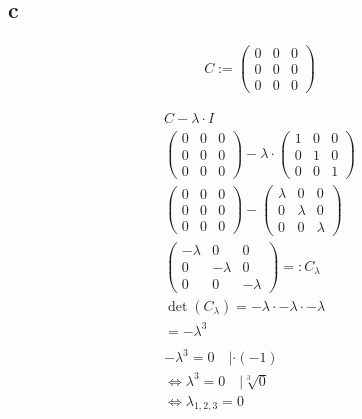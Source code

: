 \subsection{c}

\begin{align*}
    C := \begin{pmatrix}
             0 & 0 & 0 \\
             0 & 0 & 0 \\
             0 & 0 & 0
         \end{pmatrix}
\end{align*}

\begin{align*}
    C - \lambda \cdot I                                      \\
    \begin{pmatrix}
        0 & 0 & 0 \\
        0 & 0 & 0 \\
        0 & 0 & 0
    \end{pmatrix} - \lambda \cdot \begin{pmatrix}
                                      1 & 0 & 0 \\
                                      0 & 1 & 0 \\
                                      0 & 0 & 1
                                  \end{pmatrix}             \\
    \begin{pmatrix}
        0 & 0 & 0 \\
        0 & 0 & 0 \\
        0 & 0 & 0
    \end{pmatrix} - \begin{pmatrix}
                        \lambda & 0       & 0       \\
                        0       & \lambda & 0       \\
                        0       & 0       & \lambda
                    \end{pmatrix}              \\
    \begin{pmatrix}
        -\lambda & 0        & 0        \\
        0        & -\lambda & 0        \\
        0        & 0        & -\lambda
    \end{pmatrix} =: C_\lambda                           \\
    \det(C_\lambda) = -\lambda \cdot -\lambda \cdot -\lambda \\
    = -\lambda^3                                             \\\\
    -\lambda^3 = 0 \quad |\cdot (-1)                         \\
    \Leftrightarrow \lambda^3 = 0 \quad | \sqrt[3]{0}        \\
    \Leftrightarrow \lambda_{1, 2, 3} = 0
\end{align*}

